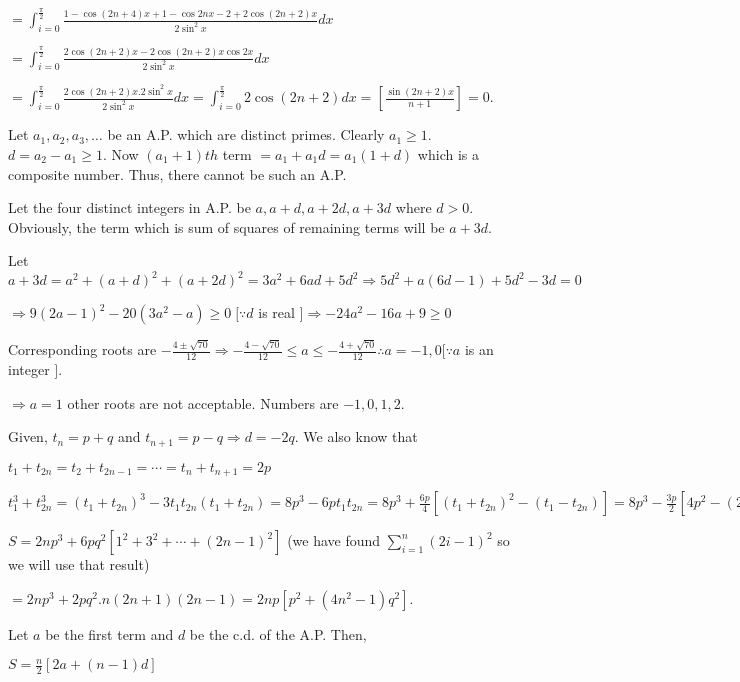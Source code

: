   $= \displaystyle\int_{i=0}^{\tfrac{\pi}{2}}\frac{1 - \cos(2n + 4)x + 1 - \cos2nx - 2 + 2\cos(2n +
    2)x}{2\sin^2x}dx$

  $= \displaystyle\int_{i=0}^{\tfrac{\pi}{2}}\frac{2\cos(2n + 2)x - 2\cos(2n + 2)x\cos2x}{2\sin^2x}dx$

  $= \displaystyle\int_{i=0}^{\tfrac{\pi}{2}}\frac{2\cos(2n + 2)x.2\sin^2x}{2\sin^2x}dx =
  \int_{i=0}^{\tfrac{\pi}{2}}2\cos(2n + 2)dx = \left[\frac{\sin(2n + 2)x}{n + 1}\right] = 0$.
\item Let $a_1, a_2, a_3, \ldots$ be an A.P. which are distinct primes. Clearly $a_1 \geq 1$. $d = a_2 -
  a_1\geq 1$. Now $(a_1 + 1)th$ term $= a_1 + a_1d = a_1(1 + d)$ which is a composite number. Thus, there
  cannot be such an A.P.
\item Let the four distinct integers in A.P. be $a, a + d, a + 2d, a + 3d$ where $d > 0$. Obviously, the
  term which is sum of squares of remaining terms will be $a + 3d$.

  Let $a + 3d = a^2 + (a + d)^2 + (a + 2d)^2 = 3a^2 + 6ad + 5d^2 \Rightarrow 5d^2 + a(6d - 1) + 5d^2 - 3d =
  0$

  $\Rightarrow 9(2a - 1)^2 - 20(3a^2 - a)\geq 0\;[\because d$ is real $] \Rightarrow -24a^2 - 16a + 9 \geq 0$

  Corresponding roots are $-\frac{4 \pm \sqrt{70}}{12} \Rightarrow -\frac{4 - \sqrt{70}}{12}\leq a\leq
  -\frac{4 + \sqrt{70}}{12}\therefore a = -1, 0[\because a$ is an integer $]$.

  $\Rightarrow a = 1$ other roots are not acceptable. Numbers are $-1, 0, 1, 2$.
\item Given, $t_n = p + q$ and $t_{n + 1} = p - q \Rightarrow d = -2q$. We also know that

  $t_1 + t_{2n} = t_2 + t_{2n - 1} = \cdots = t_n + t_{n + 1} = 2p$

  $t_1^3 + t_{2n}^3 = (t_1 + t_{2n})^3 - 3t_1t_{2n}(t_1 + t_{2n}) = 8p^3 - 6pt_1t_{2n} = 8p^3 + \frac{6p}{4}[(t_1 +
  t_{2n})^2 - (t_1 - t_{2n})] = 8p^3 - \frac{3p}{2}[4p^2 - (2n - 1)^2d^2] = 2p^3 + 6pq^2(2n - 1)^2$

  $S = 2np^3 + 6pq^2[1^2 + 3^2 + \cdots + (2n - 1)^2]$ (we have found $\displaystyle\sum_{i = 1}^n(2i -
  1)^2$ so we will use that result)

  $= 2np^3 + 2pq^2.n(2n + 1)(2n - 1) = 2np[p^2 + (4n^2 - 1)q^2]$.
\item Let $a$ be the first term and $d$ be the c.d. of the A.P. Then,

  $S = \frac{n}{2}[2a + (n - 1)d]$

